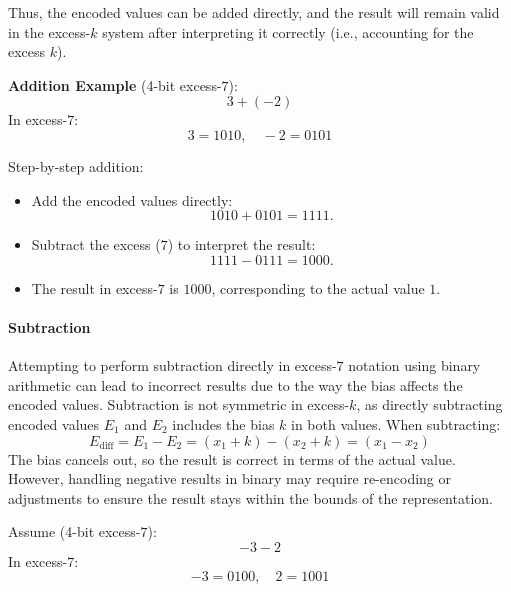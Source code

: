 Thus, the encoded values can be added directly, and the result will remain valid in the excess-\( k \) system after interpreting it correctly (i.e., accounting for the excess \( k \)).

 \vspace{\baselineskip}\par
\textbf{Addition Example} (4-bit excess-\( 7 \)):
\[
3 + (-2)
\]
In excess-\( 7 \):
\[
3 = 1010, \quad -2 = 0101
\]

Step-by-step addition:
\begin{itemize}
    \item Add the encoded values directly:
    \[
    1010 + 0101 = 1111.
    \]
    \item Subtract the excess (\( 7 \)) to interpret the result:
    \[
    1111 - 0111 = 1000.
    \]
    \item The result in excess-\( 7 \) is \( 1000 \), corresponding to the actual value \( 1 \).
\end{itemize}

\paragraph{Subtraction}
Attempting to perform subtraction directly in excess-\( 7 \) notation using binary arithmetic can lead to incorrect results due to the way the bias affects the encoded values. Subtraction is not symmetric in excess-\( k \), as directly subtracting encoded values \( E_1 \) and \( E_2 \) includes the bias \( k \) in both values. When subtracting:
\[
E_{\text{diff}} = E_1 - E_2 = (x_1 + k) - (x_2 + k) = (x_1 - x_2)
\]
The bias cancels out, so the result is correct in terms of the actual value. However, handling negative results in binary may require re-encoding or adjustments to ensure the result stays within the bounds of the representation.

 \vspace{\baselineskip}\par
Assume (4-bit excess-\( 7 \)):
\[
-3 - 2
\]
In excess-\( 7 \):
\[
-3 = 0100, \quad 2 = 1001
\]

